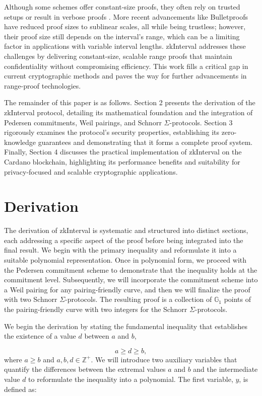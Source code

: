 \documentclass{iacrcc}
\theoremstyle{definition}
\begin{document}
Although some schemes offer constant-size proofs, they often rely on trusted setups or result in verbose proofs \cite{christetal2024}. More recent advancements like Bulletproofs \cite{bunz2018bulletproofs} have reduced proof sizes to sublinear scales, all while being trustless; however, their proof size still depends on the interval's range, which can be a limiting factor in applications with variable interval lengths. zkInterval addresses these challenges by delivering constant-size, scalable range proofs that maintain confidentiality without compromising efficiency. This work fills a critical gap in current cryptographic methods and paves the way for further advancements in range-proof technologies.

The remainder of this paper is as follows. Section 2 presents the derivation of the zkInterval protocol, detailing its mathematical foundation and the integration of Pedersen commitments, Weil pairings, and Schnorr $\Sigma$-protocols. Section 3 rigorously examines the protocol's security properties, establishing its zero-knowledge guarantees and demonstrating that it forms a complete proof system. Finally, Section 4 discusses the practical implementation of zkInterval on the Cardano blockchain, highlighting its performance benefits and suitability for privacy-focused and scalable cryptographic applications.

\section{Derivation}

The derivation of zkInterval is systematic and structured into distinct sections, each addressing a specific aspect of the proof before being integrated into the final result. We begin with the primary inequality and reformulate it into a suitable polynomial representation. Once in polynomial form, we proceed with the Pedersen commitment scheme to demonstrate that the inequality holds at the commitment level. Subsequently, we will incorporate the commitment scheme into a Weil pairing for any pairing-friendly curve, and then we will finalize the proof with two Schnorr $\Sigma$-protocols. The resulting proof is a collection of \(\mathbb{G}_{1}\) points of the pairing-friendly curve with two integers for the Schnorr $\Sigma$-protocols.

We begin the derivation by stating the fundamental inequality that establishes the existence of a value $d$ between $a$ and $b$,

\begin{equation}
a \geq d \geq b,
\end{equation}
where \( a \geq b \) and \( a, b, d \in \mathbb{Z}^+ \). We will introduce two auxiliary variables that quantify the differences between the extremal values \(a\) and \(b\) and the intermediate value \(d\) to reformulate the inequality into a polynomial. The first variable, \( y \), is defined as:
\end{document}
